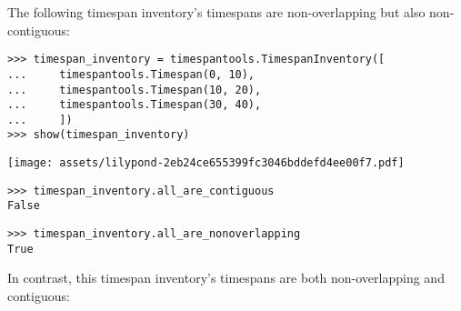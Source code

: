 \noindent The following timespan inventory's timespans are non-overlapping but
also non-contiguous:

\begin{comment}
<abjad>
timespan_inventory = timespantools.TimespanInventory([
    timespantools.Timespan(0, 10),
    timespantools.Timespan(10, 20),
    timespantools.Timespan(30, 40),
    ])
show(timespan_inventory)
timespan_inventory.all_are_contiguous
timespan_inventory.all_are_nonoverlapping
</abjad>
\end{comment}

\begin{abjadbookoutput}
\begin{singlespacing}
\vspace{-0.5\baselineskip}
\begin{verbatim}
>>> timespan_inventory = timespantools.TimespanInventory([
...     timespantools.Timespan(0, 10),
...     timespantools.Timespan(10, 20),
...     timespantools.Timespan(30, 40),
...     ])
>>> show(timespan_inventory)
\end{verbatim}
\noindent\texttt{[image: assets/lilypond-2eb24ce655399fc3046bddefd4ee00f7.pdf]}
\begin{verbatim}
>>> timespan_inventory.all_are_contiguous
False
\end{verbatim}
\begin{verbatim}
>>> timespan_inventory.all_are_nonoverlapping
True
\end{verbatim}
\end{singlespacing}
\end{abjadbookoutput}

\noindent In contrast, this timespan inventory's timespans are both
non-overlapping and contiguous:

\begin{comment}
<abjad>
timespan_inventory = timespantools.TimespanInventory([
    timespantools.Timespan(0, 10),
    timespantools.Timespan(10, 20),
    timespantools.Timespan(20, 30),
    ])
show(timespan_inventory)
timespan_inventory.all_are_contiguous
timespan_inventory.all_are_nonoverlapping
</abjad>
\end{comment}

